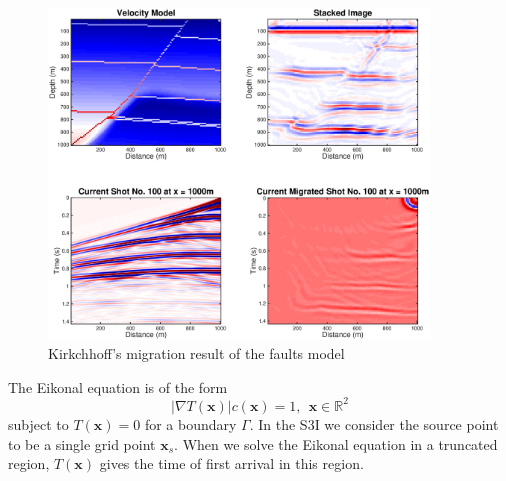 \documentclass[11pt,titlepage]{article}
\newcommand{\real}{\mathbb{R}}
\newcommand{\bx}{\boldsymbol{x}}
\theoremstyle{plain}
\theoremstyle{definition}
\theoremstyle{remark}
\numberwithin{equation}{section}
\begin{document}
\begin{figure}
\centering
\includegraphics[width=0.9\textwidth]{Fig/kirc.eps}
\caption{Kirkchhoff's migration result of the faults model}
\label{fig:kirc}
\end{figure}

The Eikonal equation is of the form
\begin{equation}
|\nabla T(\bx)| c(\bx)= 1, ~~\bx\in \real^2
\end{equation}
subject to $T(\bx) = 0$ for a boundary $\Gamma$. In the S3I we consider the source point to be a single 
grid point $\bx_s$. When we solve the Eikonal equation in a truncated region, $T(\bx)$ gives the time of 
first arrival in this region. 
\end{document}
